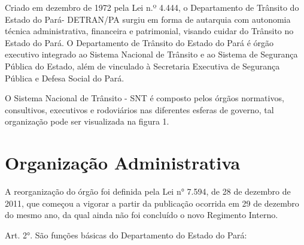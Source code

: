 \documentclass[a4paper]{article}
\begin{document}
Criado em dezembro de 1972 pela Lei n.º 4.444, o Departamento de Trânsito do Estado do Pará- DETRAN/PA surgiu em forma de autarquia com autonomia técnica administrativa, financeira e patrimonial, visando cuidar do Trânsito no Estado do Pará. O Departamento de Trânsito do Estado do Pará é órgão executivo integrado ao Sistema Nacional de Trânsito e ao Sistema de Segurança Pública do Estado, além de vinculado à Secretaria Executiva de Segurança Pública e Defesa Social do Pará.\vskip0.3cm

O Sistema Nacional de Trânsito - SNT é composto pelos órgãos normativos, consultivos, executivos e rodoviários nas diferentes esferas de governo, tal organização pode ser visualizada na figura 1.\vskip0.3cm


\section{Organização Administrativa}


A reorganização do órgão foi definida pela Lei n° 7.594, de 28 de dezembro de 2011, que começou a vigorar a partir da publicação ocorrida em 29 de dezembro do mesmo ano, da qual ainda não foi concluído o novo Regimento Interno.\vskip0.3cm

Art. 2°. São funções básicas do Departamento do Estado do Pará:\vskip0.3cm
\end{document}
